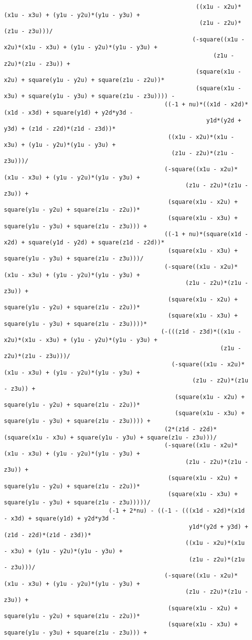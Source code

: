 \begin{lstlisting}
													   ((x1u - x2u)*(x1u - x3u) + (y1u - y2u)*(y1u - y3u) + 
														(z1u - z2u)*(z1u - z3u)))/
													  (-square((x1u - x2u)*(x1u - x3u) + (y1u - y2u)*(y1u - y3u) + 
															(z1u - z2u)*(z1u - z3u)) + 
													   (square(x1u - x2u) + square(y1u - y2u) + square(z1u - z2u))*
													   (square(x1u - x3u) + square(y1u - y3u) + square(z1u - z3u)))) - 
											  ((-1 + nu)*((x1d - x2d)*(x1d - x3d) + square(y1d) + y2d*y3d - 
														  y1d*(y2d + y3d) + (z1d - z2d)*(z1d - z3d))*
											   ((x1u - x2u)*(x1u - x3u) + (y1u - y2u)*(y1u - y3u) + 
												(z1u - z2u)*(z1u - z3u)))/
											  (-square((x1u - x2u)*(x1u - x3u) + (y1u - y2u)*(y1u - y3u) + 
													(z1u - z2u)*(z1u - z3u)) + 
											   (square(x1u - x2u) + square(y1u - y2u) + square(z1u - z2u))*
											   (square(x1u - x3u) + square(y1u - y3u) + square(z1u - z3u))) + 
											  ((-1 + nu)*(square(x1d - x2d) + square(y1d - y2d) + square(z1d - z2d))*
											   (square(x1u - x3u) + square(y1u - y3u) + square(z1u - z3u)))/
											  (-square((x1u - x2u)*(x1u - x3u) + (y1u - y2u)*(y1u - y3u) + 
													(z1u - z2u)*(z1u - z3u)) + 
											   (square(x1u - x2u) + square(y1u - y2u) + square(z1u - z2u))*
											   (square(x1u - x3u) + square(y1u - y3u) + square(z1u - z3u))))*
											 (-(((z1d - z3d)*((x1u - x2u)*(x1u - x3u) + (y1u - y2u)*(y1u - y3u) + 
															  (z1u - z2u)*(z1u - z3u)))/
												(-square((x1u - x2u)*(x1u - x3u) + (y1u - y2u)*(y1u - y3u) + 
													  (z1u - z2u)*(z1u - z3u)) + 
												 (square(x1u - x2u) + square(y1u - y2u) + square(z1u - z2u))*
												 (square(x1u - x3u) + square(y1u - y3u) + square(z1u - z3u)))) + 
											  (2*(z1d - z2d)*(square(x1u - x3u) + square(y1u - y3u) + square(z1u - z3u)))/
											  (-square((x1u - x2u)*(x1u - x3u) + (y1u - y2u)*(y1u - y3u) + 
													(z1u - z2u)*(z1u - z3u)) + 
											   (square(x1u - x2u) + square(y1u - y2u) + square(z1u - z2u))*
											   (square(x1u - x3u) + square(y1u - y3u) + square(z1u - z3u)))))/
							  (-1 + 2*nu) - ((-1 - (((x1d - x2d)*(x1d - x3d) + square(y1d) + y2d*y3d - 
													 y1d*(y2d + y3d) + (z1d - z2d)*(z1d - z3d))*
													((x1u - x2u)*(x1u - x3u) + (y1u - y2u)*(y1u - y3u) + 
													 (z1u - z2u)*(z1u - z3u)))/
											  (-square((x1u - x2u)*(x1u - x3u) + (y1u - y2u)*(y1u - y3u) + 
													(z1u - z2u)*(z1u - z3u)) + 
											   (square(x1u - x2u) + square(y1u - y2u) + square(z1u - z2u))*
											   (square(x1u - x3u) + square(y1u - y3u) + square(z1u - z3u))) + 

\end{lstlisting}
